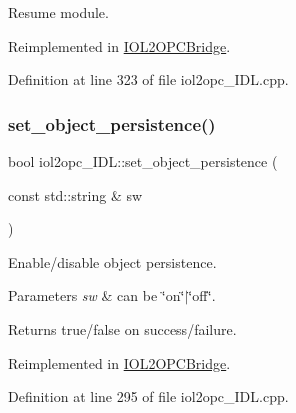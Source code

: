 Resume module. 



Reimplemented in \hyperlink{group__iol2opc_a449fd15b4e5d4e198182cb3df189e40b}{I\+O\+L2\+O\+P\+C\+Bridge}.



Definition at line 323 of file iol2opc\+\_\+\+I\+D\+L.\+cpp.

\mbox{\label{classiol2opc__IDL_a8973d954812064a1662acaaa434947e7}} 
\subsubsection{\texorpdfstring{set\+\_\+object\+\_\+persistence()}{set\_object\_persistence()}}
{\footnotesize\ttfamily bool iol2opc\+\_\+\+I\+D\+L\+::set\+\_\+object\+\_\+persistence (\begin{DoxyParamCaption}\item[{const std\+::string \&}]{sw }\end{DoxyParamCaption})\hspace{0.3cm}{\ttfamily [virtual]}}



Enable/disable object persistence. 


\begin{DoxyParams}{Parameters}
{\em sw} & can be \char`\"{}on\char`\"{}$\vert$\char`\"{}off\char`\"{}. \\
\hline
\end{DoxyParams}
\begin{DoxyReturn}{Returns}
true/false on success/failure. 
\end{DoxyReturn}


Reimplemented in \hyperlink{group__iol2opc_a4305ac00526221c453fb9f39edaf05a4}{I\+O\+L2\+O\+P\+C\+Bridge}.



Definition at line 295 of file iol2opc\+\_\+\+I\+D\+L.\+cpp.

\mbox{\label{classiol2opc__IDL_a6215d1e2e1865dcf4584e925b8c1d1be}} 
